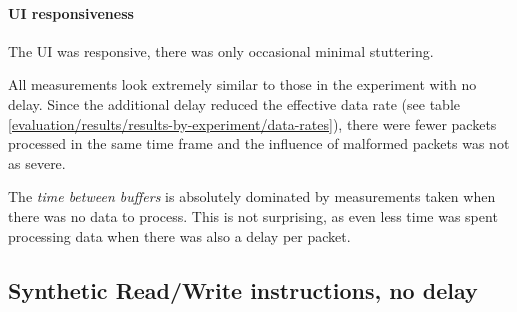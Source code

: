 \paragraph{UI responsiveness}

The UI was responsive, there was only occasional minimal stuttering.
\bigbreak

All measurements look extremely similar to those in the experiment with no delay. Since the additional
delay reduced the effective data rate (see table \ref{evaluation/results/results-by-experiment/data-rates}),
there were fewer packets processed in the same time frame and the influence of malformed packets was
not as severe.

The \textit{time between buffers} is absolutely dominated by measurements taken when there was no
data to process. This is not surprising, as even less time was spent processing data when there was
also a delay per packet.

\clearpage
\subsection{Synthetic Read/Write instructions, no delay}
\label{evaluation/results/synthetic-read-write-instructions-no-delay}

